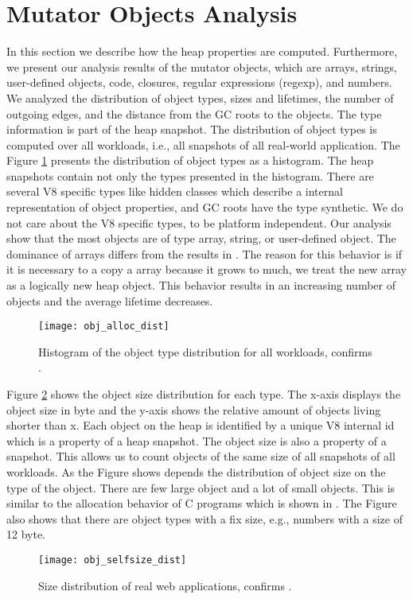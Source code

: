 \section{Mutator Objects Analysis} \label{sec:analysis_mutator}

In this section we describe how the heap properties are computed. Furthermore, we present our analysis results of the mutator objects, which are arrays, strings, user-defined objects, code, closures, regular expressions (regexp), and numbers. We analyzed the distribution of object types, sizes and lifetimes, the number of outgoing edges, and the distance from the GC roots to the objects. 
The type information is part of the heap snapshot. The distribution of object types is computed over all workloads, i.e., all snapshots of all real-world application. The Figure \ref{fig:obj_alloc_dist} presents the distribution of object types as a histogram. The heap snapshots contain not only the types presented in the histogram. There are several V8 specific types like hidden classes which describe a internal representation of object properties, and GC roots have the type synthetic. We do not care about the V8 specific types, to be platform independent. Our analysis show that the most objects are of type array, string, or user-defined object. The dominance of arrays differs from the results in \cite{JSMeter2009}. The reason for this behavior is if it is necessary to a copy a array because it grows to much, we treat the new array as a logically new heap object. This behavior results in an increasing number of objects and the average lifetime decreases. 
\begin{figure}
	\centering
	\texttt{[image: obj\_alloc\_dist]}
	\caption{Histogram of the object type distribution for all workloads, confirms \cite{JSMeter2009}.}
	\label{fig:obj_alloc_dist}
\end{figure}

Figure \ref{fig:obj_selfsize_dist} shows the object size distribution for each type. The x-axis displays the object size in byte and the y-axis shows the relative amount of objects living shorter than x. Each object on the \JS heap is identified by a unique V8 internal id which is a property of a heap snapshot. The object size is also a property of a snapshot. This allows us to count objects of the same size of all snapshots of all workloads. As the Figure shows depends the distribution of object size on the type of the object. There are few large object and a lot of small objects. This is similar to the allocation behavior of C programs which is shown in \cite{Aigner2013}. The Figure also shows that there are object types with a fix size, e.g., numbers with a size of 12 byte.
\begin{figure}
	\centering
	\texttt{[image: obj\_selfsize\_dist]}
	\caption{Size distribution of real web applications, confirms \cite{JSMeter2009}.}
	\label{fig:obj_selfsize_dist}
\end{figure}


